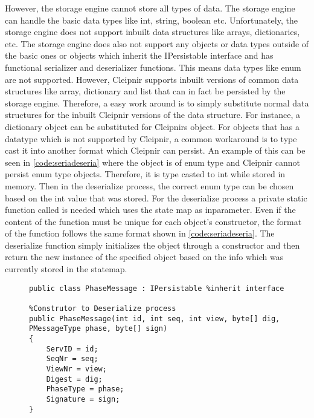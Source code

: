 However, the storage engine cannot store all types of data. The storage engine can handle the basic data types like int, string, boolean etc. Unfortunately, the storage engine does not support inbuilt data structures like arrays, dictionaries, etc. The storage engine does also not support any objects or data types outside of the basic ones or objects which inherit the IPersistable interface and has functional serializer and deserializer functions. This means data types like enum are not supported. However, Cleipnir supports inbuilt versions of common data structures like array, dictionary and list that can in fact be persisted by the storage engine. Therefore, a easy work around is to simply substitute normal data structures for the inbuilt Cleipnir versions of the data structure. For instance, a dictionary object can be substituted for Cleipnirs  object. For objects that has a datatype which is not supported by Cleipnir, a common workaround is to type cast it into another format which Cleipnir can persist. An example of this can be seen in \autoref{code:seriadeseria} where the object  is of enum type and Cleipnir cannot persist enum type objects. Therefore, it is type casted to int while stored in memory. Then in the deserialize process, the correct enum type can be chosen based on the int value that was stored. For the deserialize process a private static function called  is needed which uses the state map as inparameter. Even if the content of the function must be unique for each object’s constructor, the format of the function follows the same format shown in \autoref{code:seriadeseria}. The deserialize function simply initializes the object through a constructor and then return the new instance of the specified object based on the info which was currently stored in the statemap.

\begin{figure}[H]
	\centering
	\begin{lstlisting}[label = code:interfaceexample, caption=Persistent initialize process, captionpos=b, basicstyle=\scriptsize]
public class PhaseMessage : IPersistable %inherit interface
		
%Construtor to Deserialize process
public PhaseMessage(int id, int seq, int view, byte[] dig, PMessageType phase, byte[] sign)
{
    ServID = id;
    SeqNr = seq;
    ViewNr = view;
    Digest = dig;
    PhaseType = phase;
    Signature = sign;
}
	\end{lstlisting}
\end{figure}

